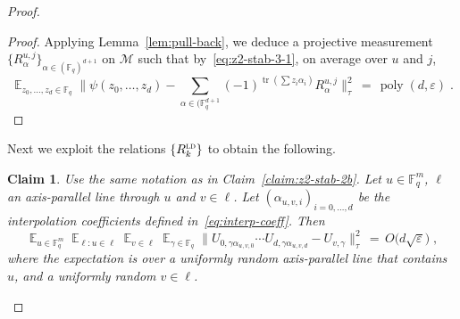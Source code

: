 \documentclass[11pt]{article}
\newtheorem{claim}[theorem]{Claim}
\theoremstyle{definition}
\DeclareMathOperator*{\Expectation}{\mathbb{E}}
\newcommand{\Es}[1]{\Expectation_{#1}}
\newcommand{\F}{\ensuremath{\mathbb{F}}}
\newcommand{\ld}{\textsc{ld}}
\newcommand{\mM}{\ensuremath{\mathcal{M}}}
\DeclareMathOperator{\poly}{poly}
\newcommand{\eps}{\varepsilon}
\DeclareMathOperator{\tr}{tr}
\begin{document}
\begin{proof}
\begin{proof}
Applying Lemma~\ref{lem:pull-back}, we deduce a projective measurement $\{R^{u,j}_\alpha\}_{\alpha\in (\F_q)^{d+1}}$  on $\mM$ such that by~\eqref{eq:z2-stab-3-1}, on average over $u$ and $j$,
\[  \Es{z_0,\ldots,z_{d}\in\F_q} \Big\| \psi(z_0,\ldots,z_{d}) -  \sum_{\alpha\in (\F_q^{d+1}} (-1)^{\tr(\sum z_i\alpha_i)} R_\alpha^{u,j}\Big\|_\tau^2 \,=\, \poly(d,\eps)\;.\]
\end{proof}



Next we exploit the relations $\{R^\ld_k\}$ to obtain the following. 

\begin{claim}\label{claim:z2-stab-5}
Use the same notation as in Claim~\ref{claim:z2-stab-2b}. Let $u\in \F_q^m$, $\ell$ an axis-parallel line through $u$ and $v\in\ell$. Let $(\alpha_{u,v,i})_{i=0,\ldots,d}$ be the interpolation coefficients defined in~\eqref{eq:interp-coeff}. %
Then 
\begin{equation}\label{eq:z2-stab-5-0}
\Es{u\in\F_q^m} \Es{\ell: u\in \ell} \Es{v\in \ell} \Es{\gamma\in\F_q} \Big\| U_{0,\gamma \alpha_{u,v,0}}\cdots U_{d,\gamma  \alpha_{u,v,d}} - U_{v,\gamma} \big\|_\tau^2 \,=\, O\big(d\sqrt{\eps}\big)\;,
\end{equation}
where the expectation is over a uniformly random axis-parallel line that contains $u$, and a uniformly random $v\in\ell$. 
\end{claim}


\end{proof}
\end{document}
